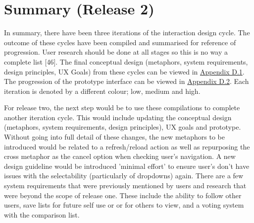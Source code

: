 \documentclass[a4 paper, 12pt]{article}
\begin{document}
\pagebreak


\pagebreak

\pagebreak


\pagebreak
\section{Summary (Release 2)}
In summary, there have been three iterations of the interaction design cycle. The outcome of these cycles have been compiled and summarised for reference of progression. User research should be done at all stages so this is no way a complete list [46]. The final conceptual design (metaphors, system requirements, design principles, UX Goals) from these cycles can be viewed in \hyperref[sec:D.1]{Appendix D.1}. The progression of the prototype interface can be viewed in \hyperref[sec:D.2]{Appendix D.2}. Each iteration is denoted by a different colour; \textcolor{mygreen}{low}, \textcolor{myblue}{medium} and \textcolor{myorange}{high}. 

For release two, the next step would be to use these compilations to complete another iteration cycle. This would include updating the conceptual design (metaphors, system requirements, design principles), UX goals and prototype. Without going into full detail of these changes, the new metaphors to be introduced would be related to a refresh/reload action as well as repurposing the cross metaphor as the cancel option when checking user's navigation. A new design guideline would be introduced 'minimal effort' to ensure user's don't have issues with the selectability (particularly of dropdowns) again. There are a few system requirements that were previously mentioned by users and research that were beyond the scope of release one. These include the ability to follow other users, save lists for future self use or or for others to view, and a voting system with the comparison list.
\end{document}
